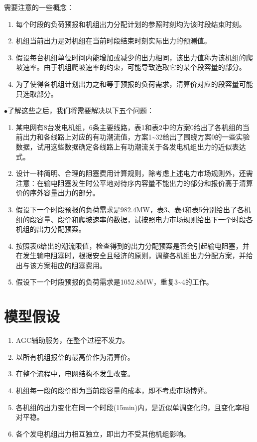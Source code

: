\documentclass[12pt,a4paper]{ctexart}
\begin{document}
\vspace{0.5em}

{\noindent {\Large $\bullet$}需要注意的一些概念：}
\begin{enumerate}[ a.]
	\item 每个时段的负荷预报和机组出力分配计划的参照时刻均为该时段结束时刻。
	\item 机组当前出力是对机组在当前时段结束时刻实际出力的预测值。
	\item 假设每台机组单位时间内能增加或减少的出力相同，该出力值称为该机组的爬坡速率。由于机组爬坡速率的约束，可能导致选取它的某个段容量的部分。
	\item 为了使得各机组计划出力之和等于预报的负荷需求，清算价对应的段容量可能只选取部分。
\end{enumerate}
\vspace{0.5em}
{\Large $\bullet$}了解这些之后，我们将需要解决以下五个问题：
\begin{enumerate}[ (1)]
	\item 某电网有8台发电机组，6条主要线路，表1和表2中的方案0给出了各机组的当前出力和各线路上对应的有功潮流值，方案1\~{}32给出了围绕方案0的一些实验数据，试用这些数据确定各线路上有功潮流关于各发电机组出力的近似表达式。
	\item 设计一种简明、合理的阻塞费用计算规则，除考虑上述电力市场规则外，还需注意：在输电阻塞发生时公平地对待序内容量不能出力的部分和报价高于清算价的序外容量出力的部分。
	\item 假设下一个时段预报的负荷需求是982.4MW，表3、表4和表5分别给出了各机组的段容量、段价和爬坡速率的数据，试按照电力市场规则给出下一个时段各机组的出力分配预案。
	\item 按照表6给出的潮流限值，检查得到的出力分配预案是否会引起输电阻塞，并在发生输电阻塞时，根据安全且经济的原则，调整各机组出力分配方案，并给出与该方案相应的阻塞费用。
	\item 假设下一个时段预报的负荷需求是1052.8MW，重复3\~{}4的工作。
\end{enumerate}






\section{模型假设}
\begin{enumerate}[1.]
\item AGC辅助服务，在整个过程不发力。
\item 以所有机组报价的最高价作为清算价。
\item 在整个流程中，电网结构不发生改变。
\item 机组每一段的段价即为当前段容量的成本，即不考虑市场博弈。
\item 各机组的出力变化在同一个时段(15min)内，是近似单调变化的，且变化率相对平稳。
\item 各个发电机组出力相互独立，即出力不受其他机组影响。

\end{enumerate}
\end{document}
